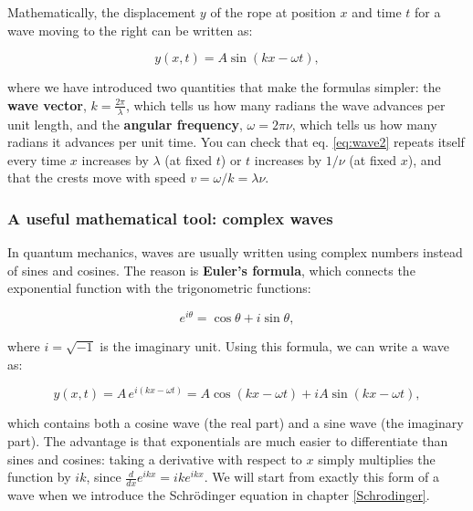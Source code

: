 \documentclass[
  english,
  9pt,
]{extbook}
\theoremstyle{definition}
\theoremstyle{definition}
\theoremstyle{definition}
\theoremstyle{definition}
\theoremstyle{remark}
\begin{document}
Mathematically, the displacement \(y\) of the rope at position \(x\) and time \(t\) for a wave moving to the right can be written as:

\begin{equation}
y(x,t) = A\sin(kx-\omega t),
\label{eq:wave2}
\end{equation}

where we have introduced two quantities that make the formulas simpler: the \textbf{wave vector}, \(k=\frac{2\pi}{\lambda}\), which tells us how many radians the wave advances per unit length, and the \textbf{angular frequency}, \(\omega=2\pi\nu\), which tells us how many radians it advances per unit time. You can check that eq. \eqref{eq:wave2} repeats itself every time \(x\) increases by \(\lambda\) (at fixed \(t\)) or \(t\) increases by \(1/\nu\) (at fixed \(x\)), and that the crests move with speed \(v=\omega/k=\lambda\nu\).

\subsubsection*{A useful mathematical tool: complex waves}\label{a-useful-mathematical-tool-complex-waves}

In quantum mechanics, waves are usually written using complex numbers instead of sines and cosines. The reason is \textbf{Euler's formula}, which connects the exponential function with the trigonometric functions:

\begin{equation}
e^{i\theta}=\cos\theta + i\sin\theta,
\label{eq:euler}
\end{equation}

where \(i=\sqrt{-1}\) is the imaginary unit. Using this formula, we can write a wave as:

\begin{equation}
y(x,t) = A\,e^{i(kx-\omega t)} = A\cos(kx-\omega t) + iA\sin(kx-\omega t),
\label{eq:wave3}
\end{equation}

which contains both a cosine wave (the real part) and a sine wave (the imaginary part). The advantage is that exponentials are much easier to differentiate than sines and cosines: taking a derivative with respect to \(x\) simply multiplies the function by \(ik\), since \(\frac{d}{dx}e^{ikx}=ike^{ikx}\). We will start from exactly this form of a wave when we introduce the Schrödinger equation in chapter \ref{Schrodinger}.
\end{document}
